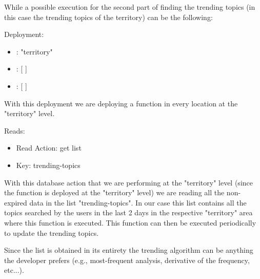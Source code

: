 While a possible execution for the second part of finding the trending topics (in this case the trending topics of the territory) can be the following:
\begin{example}
Deployment:
\begin{itemize}
    \item {}: "territory"
    \item {}: [ ]
    \item {}: [ ]
\end{itemize}
With this deployment we are deploying a function in every location at the "territory" level.

Reads:
\begin{itemize}
    \item Read Action: get list
    \item Key: trending-topics
\end{itemize}
With this database action that we are performing at the "territory" level (since the function is deployed at the "territory" level) we are reading all the non-expired data in the list "trending-topics". In our case this list contains all the topics searched by the users in the last 2 days in the respective "territory" area where this function is executed. This function can then be executed periodically to update the trending topics.

Since the list is obtained in its entirety the trending algorithm can be anything the developer prefers (e.g., most-frequent analysis, derivative of the frequency, etc...).
\end{example}

